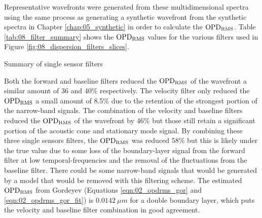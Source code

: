 Representative wavefronts were generated from these multidimensional spectra using the same process as generating a synthetic wavefront from the synthetic spectra in Chapter \ref{chap:05_synthetic} in order to calculate the $\operatorname{OPD_{RMS}}$.
Table \ref{tab:08_filter_summary} shows the $\operatorname{OPD_{RMS}}$ values for the various filters used in Figure \ref{fig:08_dispersion_filters_slices}.
\begin{table}
  \centering
  \caption{Summary of single sensor filters}
  
  \label{tab:08_filter_summary}
\end{table}
Both the forward and baseline filters reduced the $\operatorname{OPD_{RMS}}$ of the wavefront a similar amount of 36 and 40\% respectively.
The velocity filter only reduced the $\operatorname{OPD_{RMS}}$ a small amount of 8.5\% due to the retention of the strongest portion of the narrow-band signals.
The combination of the velocity and baseline filters reduced the $\operatorname{OPD_{RMS}}$ of the wavefront by 46\% but those still retain a significant portion of the acoustic cone and stationary mode signal.
By combining these three single sensors filters, the $\operatorname{OPD_{RMS}}$ was reduced 58\% but this is likely under the true value due to some loss of the boundary-layer signal from the forward filter at low temporal-frequencies and the removal of the fluctuations from the baseline filter.
There could be some narrow-band signals that would be generated by a model that would be removed with this filtering scheme.
The estimated $\operatorname{OPD_{RMS}}$ from Gordeyev \cite{Gordeyev-2014-jcJndkHM} (Equations \ref{eqn:02_opdrms_gor} and \ref{eqn:02_opdrms_gor_fit}) is $0.0142\ \mu m$ for a double boundary layer, which puts the velocity and baseline filter combination in good agreement.


